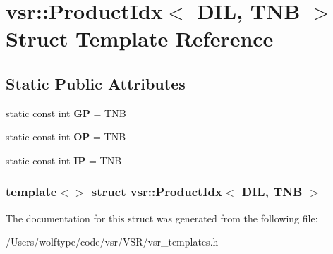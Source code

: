 \hypertarget{structvsr_1_1_product_idx_3_01_d_i_l_00_01_t_n_b_01_4}{\section{vsr\-:\-:Product\-Idx$<$ D\-I\-L, T\-N\-B $>$ Struct Template Reference}
\label{structvsr_1_1_product_idx_3_01_d_i_l_00_01_t_n_b_01_4}
}
\subsection*{Static Public Attributes}
\begin{DoxyCompactItemize}
\item 
\hypertarget{structvsr_1_1_product_idx_3_01_d_i_l_00_01_t_n_b_01_4_aa04174a37618580fb7acdb1dca31e61a}{static const int {\bfseries G\-P} = T\-N\-B}\label{structvsr_1_1_product_idx_3_01_d_i_l_00_01_t_n_b_01_4_aa04174a37618580fb7acdb1dca31e61a}

\item 
\hypertarget{structvsr_1_1_product_idx_3_01_d_i_l_00_01_t_n_b_01_4_ae036ec61719d42910ed83d432e93d0eb}{static const int {\bfseries O\-P} = T\-N\-B}\label{structvsr_1_1_product_idx_3_01_d_i_l_00_01_t_n_b_01_4_ae036ec61719d42910ed83d432e93d0eb}

\item 
\hypertarget{structvsr_1_1_product_idx_3_01_d_i_l_00_01_t_n_b_01_4_aac9d01eb88930f215bcbca2acaab850d}{static const int {\bfseries I\-P} = T\-N\-B}\label{structvsr_1_1_product_idx_3_01_d_i_l_00_01_t_n_b_01_4_aac9d01eb88930f215bcbca2acaab850d}

\end{DoxyCompactItemize}
\subsubsection*{template$<$$>$ struct vsr\-::\-Product\-Idx$<$ D\-I\-L, T\-N\-B $>$}



The documentation for this struct was generated from the following file\-:\begin{DoxyCompactItemize}
\item 
/\-Users/wolftype/code/vsr/\-V\-S\-R/vsr\-\_\-templates.\-h\end{DoxyCompactItemize}
